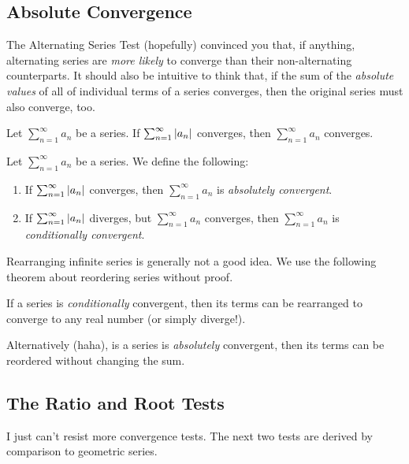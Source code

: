 \documentclass{article}
\begin{document}
      \subsection{Absolute Convergence}
      The Alternating Series Test (hopefully) convinced you that, if anything, alternating series are \emph{more likely} to converge than their non-alternating counterparts. It should also be intuitive to think that, if the sum of the \emph{absolute values} of all of individual terms of a series converges, then the original series must also converge, too. 

      \begin{prop}
        \everymath{\displaystyle}
        Let \(\sum_{n=1}^{\infty}a_n\) be a series. If \(\sum_{n=1}^{\infty}\left\lvert a_n\right\rvert\) converges, then \(\sum_{n=1}^{\infty}a_n\) converges.
      \end{prop}

      \begin{defi}
        \everymath{\displaystyle}
        Let \(\sum_{n=1}^{\infty}a_n\) be a series. We define the following:
        \begin{enumerate}
          \item If \(\sum_{n=1}^{\infty}\left\lvert a_n\right\rvert\) converges, then \(\sum_{n=1}^{\infty}a_n\) is \emph{absolutely convergent}.
          \item If \(\sum_{n=1}^{\infty}\left\lvert a_n\right\rvert\) diverges, but \(\sum_{n=1}^{\infty}a_n\) converges, then \(\sum_{n=1}^{\infty}a_n\) is \emph{conditionally convergent}.
        \end{enumerate}
      \end{defi}

      Rearranging infinite series is generally not a good idea. We use the following theorem about reordering series without proof.

      \begin{thm}
          If a series is \emph{conditionally} convergent, then its terms can be rearranged to converge to any real number (or simply diverge!).

          Alternatively (haha), is a series is \emph{absolutely} convergent, then its terms can be reordered without changing the sum.
      \end{thm}


      \subsection{The Ratio and Root Tests}
      I just can't resist more convergence tests. The next two tests are derived by comparison to geometric series.
\end{document}
